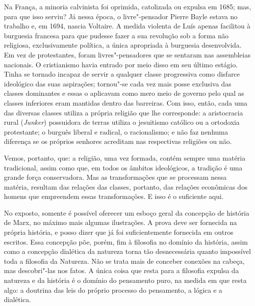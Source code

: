 Na França, a minoria calvinista foi oprimida, catolizada ou expulsa em
1685; mas, para que isso serviu? Já nessa época, o
livre"-pensador Pierre
Bayle estava no trabalho e, em 1694,
nascia Voltaire.
A medida violenta
de Luís  apenas facilitou à burguesia francesa para que pudesse fazer a sua
revolução sob a forma não religiosa, exclusivamente política, a única
apropriada à burguesia desenvolvida. Em vez de protestantes, foram
livres"-pensadores que se sentaram nas assembleias nacionais. O
cristianismo havia entrado por meio disso em seu último estágio. Tinha
se tornado incapaz de servir a qualquer classe progressiva como disfarce
ideológico das suas aspirações; tornou"-se cada vez mais posse exclusiva
das classes dominantes e essas o aplicavam como mero meio de governo
pelo qual as classes inferiores eram mantidas dentro das barreiras. Com
isso, então, cada uma das diversas classes utiliza a própria religião
que lhe corresponde: a aristocracia rural (\emph{Junker}) possuidora de
terras utiliza o jesuitismo católico ou a ortodoxia protestante; o
burguês liberal e radical, o racionalismo; e não faz nenhuma diferença
se os próprios senhores acreditam nas respectivas religiões ou não.

Vemos, portanto, que: a religião, uma vez formada, contém sempre uma
matéria tradicional, assim como que, em todos os âmbitos ideológicos, a
tradição é uma grande força conservadora. Mas as transformações que se
processam nessa matéria, resultam das relações das classes, portanto,
das relações econômicas dos homens que empreendem essas transformações.
E isso é o suficiente aqui.

No exposto, somente é possível oferecer um esboço geral da concepção de
história de Marx, no máximo mais algumas ilustrações. A prova deve ser
fornecida na própria história, e posso dizer que já foi suficientemente
fornecida em outros escritos. Essa concepção põe, porém, fim à filosofia
no domínio da história, assim como a concepção dialética da natureza
torna tão desnecessária quanto impossível toda a filosofia da Natureza.
Não se trata mais de conceber conexões na cabeça, mas descobri"-las nos
fatos. A única coisa que resta para a filosofia expulsa da natureza e da
história é o domínio do pensamento puro, na medida em que resta algo: a
doutrina das leis do próprio processo do pensamento, a lógica e a
dialética.

\asterisc

